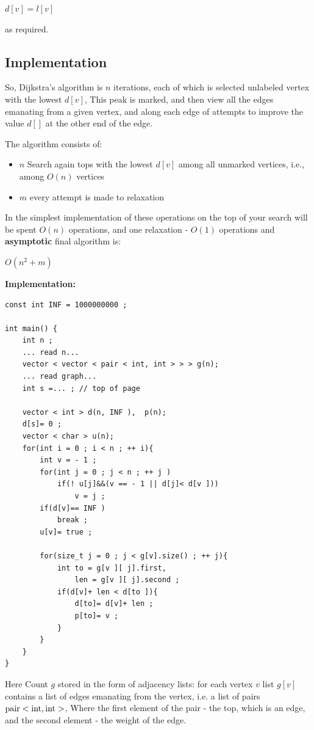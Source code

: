 $d [v] = l [v]$

as required.

\subsection{ Implementation }

So, Dijkstra's algorithm is $n$ iterations, each of which is selected unlabeled vertex with the lowest $d [v]$, This peak is marked, and then view all the edges emanating from a given vertex, and along each edge of attempts to improve the value $d []$ at the other end of the edge.

The algorithm consists of: \begin{itemize} \item $n$ Search again tops with the lowest $d [v]$ among all unmarked vertices, i.e., among $O (n)$ vertices \item $m$ every attempt is made to relaxation \end{itemize}

In the simplest implementation of these operations on the top of your search will be spent $O (n)$ operations, and one relaxation - $O (1)$ operations and \textbf{asymptotic} final algorithm is:

$O (n ^ 2 + m)$

\textbf{Implementation:}

\begin{verbatim}
const int INF = 1000000000 ;
 
int main() {
    int n ;
    ... read n...
    vector < vector < pair < int, int > > > g(n);
    ... read graph...
    int s =... ; // top of page
 
    vector < int > d(n, INF ),  p(n);
    d[s]= 0 ;
    vector < char > u(n);
    for(int i = 0 ; i < n ; ++ i){
        int v = - 1 ;
        for(int j = 0 ; j < n ; ++ j )
            if(! u[j]&&(v == - 1 || d[j]< d[v ]))
                v = j ;
        if(d[v]== INF )
            break ;
        u[v]= true ;
 
        for(size_t j = 0 ; j < g[v].size() ; ++ j){
            int to = g[v ][ j].first,
                len = g[v ][ j].second ;
            if(d[v]+ len < d[to ]){
                d[to]= d[v]+ len ;
                p[to]= v ;
            }
        }
    }
} 
\end{verbatim}
Here Count $g$ stored in the form of adjacency lists: for each vertex $v$ list $g [v]$ contains a list of edges emanating from the vertex, i.e. a list of pairs $\rm pair <int,int>$, Where the first element of the pair - the top, which is an edge, and the second element - the weight of the edge.

